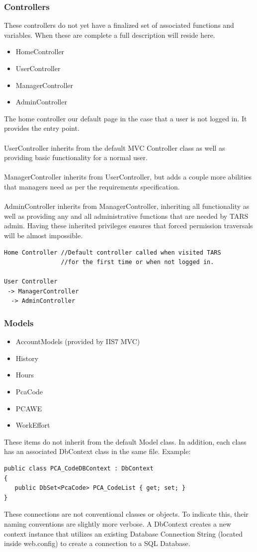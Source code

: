 \documentclass[letterpaper]{article}
\begin{document}
\subsubsection{Controllers}
These controllers do not yet have a finalized set of associated functions and variables. When these are complete a full description will reside here.
\begin{itemize}
\item HomeController
\item UserController
\item ManagerController
\item AdminController
\end{itemize}
The home controller our default page in the case that a user is not logged in. It provides the entry point. \\
\\
UserController inherits from the default MVC Controller class as well as providing basic functionality for a normal user.\\
\\
ManagerController inherits from UserController, but adds a couple more abilities that managers need as per the requirements specification.\\
\\
AdminController inherits from ManagerController, inheriting all functionality as well as providing any and all administrative functions that are needed by TARS admin. Having these inherited privileges ensures that forced permission traversals will be almost impossible.\\ 
\begin{verbatim}
Home Controller //Default controller called when visited TARS 
                //for the first time or when not logged in.

User Controller
 -> ManagerController
  -> AdminController

\end{verbatim}
\subsubsection{Models}
\begin{itemize}
\item AccountModels (provided by IIS7 MVC)
\item History
\item Hours
\item PcaCode
\item PCAWE
\item WorkEffort
\end{itemize}
These items do not inherit from the default Model class. In addition, each class has an associated DbContext class in the same file. Example:
\begin{verbatim}
public class PCA_CodeDBContext : DbContext
{
   public DbSet<PcaCode> PCA_CodeList { get; set; }
}
\end{verbatim}
These connections are not conventional classes or objects. To indicate this, their naming conventions are slightly more verbose. A DbContext creates a new context instance that utilizes an existing Database Connection String (located inside web.config) to create a connection to a SQL Database.
\end{document}

